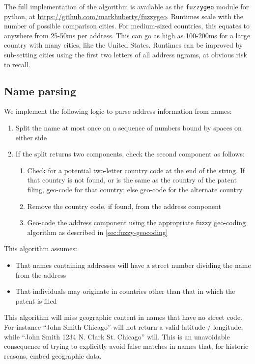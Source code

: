 \documentclass[11pt]{article}
\begin{document}
The full implementation of the algorithm is available as the
\texttt{fuzzygeo} module for python, at
\url{https://github.com/markhuberty/fuzzygeo}. Runtimes scale with the
number of possible comparison cities. For medium-sized
countries, this equates to anywhere from 25-50ms per address. This can
go as high as 100-200ms for a large country with many cities, like the
United States. Runtimes can be improved by sub-setting cities using the
first two letters of all address ngrams, at obvious risk to
recall. 

\subsection{Name parsing}
\label{sec:name-parsing}

We implement the following logic to parse address information from
names:
\begin{enumerate}
\item Split the name at most once on a sequence of numbers bound by
  spaces on either side
\item If the split returns two components, check the second component
  as follows:
  \begin{enumerate}
  \item Check for a potential two-letter country code at the end of
    the string. If that country is not found, or is the same as the
    country of the patent filing, geo-code for that country; else
    geo-code for the alternate country
  \item Remove the country code, if found, from the address component
  \item Geo-code the address component using the appropriate fuzzy
    geo-coding algorithm as described in \ref{sec:fuzzy-geocoding} 
  \end{enumerate}
\end{enumerate}

This algorithm assumes:
\begin{itemize}
\item That names containing addresses will have a street number
  dividing the name from the address
\item That individuals may originate in countries other than that
  in which the patent is filed
\end{itemize}

This algorithm will miss geographic content in names that have no
street code. For instance ``John Smith Chicago'' will not return a
valid latitude / longitude, while ``John Smith 1234 N. Clark
St. Chicago'' will. This is an unavoidable consequence of trying to
explicitly avoid false matches in names that, for historic reasons,
embed geographic data. 
\end{document}
